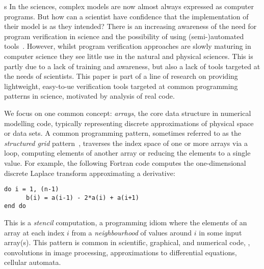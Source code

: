 s\noindent
In the sciences, complex models are now almost always expressed as
computer programs. But how can a scientist have confidence that the
implementation of their model is as they intended? There is an
increasing awareness of the need for program verification in science
and the possibility of using (semi-)automated
tools~\cite{post2005computational,oberkampf2010verification,orchard2014computational}.
However, whilst program verification approaches are slowly maturing in
computer science they see little use in the natural and physical
sciences. This is partly due to a lack of training and awareness, but
also a lack of tools targeted at the needs of scientists. This
paper is part of a line of research on providing lightweight, easy-to-ue
verification tools targeted at common programming patterns in science,
motivated by analysis of real code.

We focus on one common concept: \emph{arrays}, the core data structure
in numerical modelling code, typically representing discrete
approximations of physical space or data sets. A common programming
pattern, sometimes referred to as the \emph{structured grid}
pattern~\cite{Asanovic2006}, traverses the index space of one or more
arrays via a loop, computing elements of another array or reducing the
elements to a single value. For example, the following Fortran code
computes the one-dimensional discrete Laplace transform approximating
a derivative:
%
\begin{verbatim}
do i = 1, (n-1)
      b(i) = a(i-1) - 2*a(i) + a(i+1)
end do
\end{verbatim}
%
This is a \emph{stencil} computation, a programming idiom
where the elements of an array at each index $i$ from a
\emph{neighbourhood} of values around $i$ in some input array(s). This
pattern is common in scientific, graphical, and numerical
code, \eg{}, convolutions in image processing, approximations
to differential equations, cellular automata.


